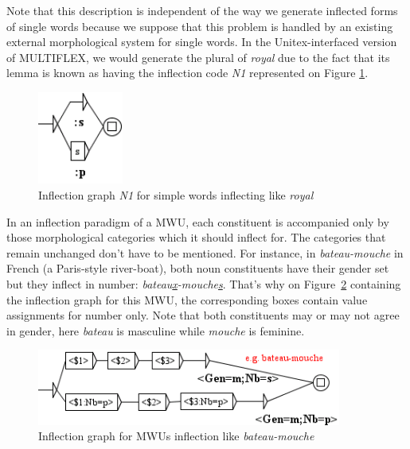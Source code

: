 \bigskip
\noindent Note that this description is independent of the way we generate inflected forms 
of single words because we suppose that this problem is handled by an existing external 
morphological system for single words. In the Unitex-interfaced version of
MULTIFLEX, we would generate the plural of \emph{royal} due to the fact that its lemma is known as having 
the inflection code \emph{N1} represented on Figure \ref{fig:N1}.

\begin{figure}[!htb]
  \centering
  \includegraphics[width=2.8cm]{resources/img/N1'EN.png}
  \caption{Inflection graph \emph{N1} for simple words inflecting like \emph{royal}}
  \label{fig:N1}
\end{figure}

\bigskip
\noindent In an inflection paradigm of a MWU, each constituent is accompanied only by those 
morphological categories which it should inflect for. The categories that remain unchanged 
don't have to be mentioned. For instance, in \emph{bateau-mouche} in French (a Paris-style 
river-boat), both noun constituents have their gender set but they inflect in 
number: \emph{bateau\underline{x}-mouche\underline{s}}. That's why on Figure~\ref{fig:BateauMouche1} 
containing the inflection graph for this MWU, the corresponding boxes contain value assignments for 
number only. Note that both constituents may or may not agree in gender, here \emph{bateau} 
is masculine while \emph{mouche} is feminine.

\begin{figure}[!htb]
  \centering
  \includegraphics[width=10cm]{resources/img/BateauMouche1.png}
  \caption{Inflection graph for MWUs inflection like \emph{bateau-mouche}}
  \label{fig:BateauMouche1}
\end{figure}

